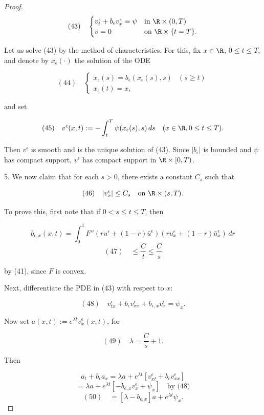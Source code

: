\begin{proof}
$$(43) \quad \begin{cases} v_t^{\epsilon} + b_{\epsilon} v_x^{\epsilon} = \psi & \text{in } \R \times (0,T) \\ v = 0 & \text{on } \R \times \{t = T\}. \end{cases}$$

Let us solve (43) by the method of characteristics. For this, fix $x \in \R$, $0 \le t \le T$, and denote by $x_{\epsilon}(\cdot)$ the solution of the ODE

$$(44) \quad \begin{cases} \dot{x}_{\epsilon}(s) = b_{\epsilon}(x_{\epsilon}(s), s) & (s \ge t) \\ x_{\epsilon}(t) = x, \end{cases}$$

and set

$$(45) \quad v^{\epsilon}(x,t) := -\int_t^T \psi(x_{\epsilon}(s), s) \, ds \quad (x \in \R, 0 \le t \le T).$$

Then $v^{\epsilon}$ is smooth and is the unique solution of (43). Since $|b_{\epsilon}|$ is bounded and $\psi$ has compact support, $v^{\epsilon}$ has compact support in $\R \times [0,T)$.

5. We now claim that for each $s > 0$, there exists a constant $C_s$ such that

$$(46) \quad |v_x^{\epsilon}| \le C_s \quad \text{on } \R \times (s,T).$$

To prove this, first note that if $0 < s \le t \le T$, then

$$b_{\epsilon,x}(x,t) = \int_0^1 F''(ru^{\epsilon} + (1-r)\bar{u}^{\epsilon})(ru_x^{\epsilon} + (1-r)\bar{u}_x^{\epsilon}) \, dr$$
$$(47) \quad \le \frac{C}{t} \le \frac{C}{s}$$

by (41), since $F$ is convex.

Next, differentiate the PDE in (43) with respect to $x$:

$$(48) \quad v_{tx}^{\epsilon} + b_{\epsilon} v_{xx}^{\epsilon} + b_{\epsilon,x} v_x^{\epsilon} = \psi_x.$$

Now set $a(x,t) := e^{\lambda t} v_x^{\epsilon}(x,t)$, for

$$(49) \quad \lambda = \frac{C}{s} + 1.$$

Then

$$a_t + b_{\epsilon} a_x = \lambda a + e^{\lambda t}[v_{xt}^{\epsilon} + b_{\epsilon} v_{xx}^{\epsilon}]$$
$$= \lambda a + e^{\lambda t}[-b_{\epsilon,x} v_x^{\epsilon} + \psi_x] \quad \text{by (48)}$$
$$(50) \quad = [\lambda - b_{\epsilon,x}] a + e^{\lambda t} \psi_x.$$


\end{proof}

